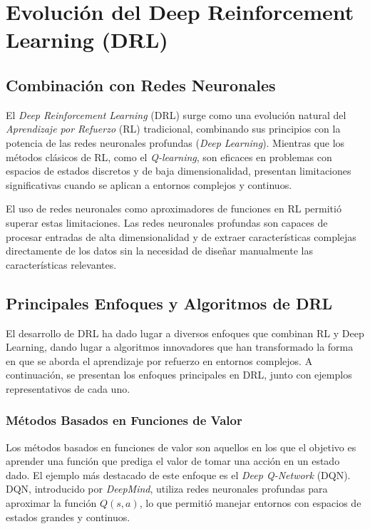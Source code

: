 \documentclass[a4paper,12pt]{report}
\begin{document}
\section{Evolución del Deep Reinforcement Learning (DRL)}

\subsection{Combinación con Redes Neuronales}

El \textit{Deep Reinforcement Learning} (DRL) surge como una evolución natural del 
\textit{Aprendizaje por Refuerzo} (RL) tradicional, combinando sus principios con la potencia 
de las redes neuronales profundas (\textit{Deep Learning}). Mientras que los métodos clásicos 
de RL, como el \textit{Q-learning}, son eficaces en problemas con espacios de estados discretos 
y de baja dimensionalidad, presentan limitaciones significativas cuando se aplican a entornos 
complejos y continuos.

El uso de redes neuronales como aproximadores de funciones en RL permitió superar estas 
limitaciones. Las redes neuronales profundas son capaces de procesar entradas de alta 
dimensionalidad y de extraer características complejas directamente de los datos sin la necesidad 
de diseñar manualmente las características relevantes. 

\subsection{Principales Enfoques y Algoritmos de DRL}

El desarrollo de DRL ha dado lugar a diversos enfoques que combinan RL y Deep Learning, dando 
lugar a algoritmos innovadores que han transformado la forma en que se aborda el aprendizaje 
por refuerzo en entornos complejos. A continuación, se presentan los enfoques principales en 
DRL, junto con ejemplos representativos de cada uno.

\subsubsection{Métodos Basados en Funciones de Valor}

Los métodos basados en funciones de valor son aquellos en los que el objetivo es aprender 
una función que prediga el valor de tomar una acción en un estado dado. El ejemplo más 
destacado de este enfoque es el \textit{Deep Q-Network} (DQN). DQN, introducido por 
\textit{DeepMind}, utiliza redes neuronales profundas para aproximar la función \(Q(s, a)\), 
lo que permitió manejar entornos con espacios de estados grandes y continuos.
\end{document}
